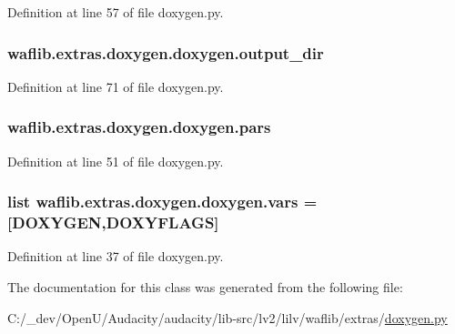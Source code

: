 Definition at line 57 of file doxygen.\+py.

\subsubsection[{\texorpdfstring{output\+\_\+dir}{output_dir}}]{\setlength{\rightskip}{0pt plus 5cm}waflib.\+extras.\+doxygen.\+doxygen.\+output\+\_\+dir}\hypertarget{classwaflib_1_1extras_1_1doxygen_1_1doxygen_a6dda9f470be0c485902a1ede0801cf14}{}\label{classwaflib_1_1extras_1_1doxygen_1_1doxygen_a6dda9f470be0c485902a1ede0801cf14}


Definition at line 71 of file doxygen.\+py.

\subsubsection[{\texorpdfstring{pars}{pars}}]{\setlength{\rightskip}{0pt plus 5cm}waflib.\+extras.\+doxygen.\+doxygen.\+pars}\hypertarget{classwaflib_1_1extras_1_1doxygen_1_1doxygen_a431448bf1c1cb60dbf666faa1ec27bfb}{}\label{classwaflib_1_1extras_1_1doxygen_1_1doxygen_a431448bf1c1cb60dbf666faa1ec27bfb}


Definition at line 51 of file doxygen.\+py.

\subsubsection[{\texorpdfstring{vars}{vars}}]{\setlength{\rightskip}{0pt plus 5cm}list waflib.\+extras.\+doxygen.\+doxygen.\+vars = \mbox{[}\textquotesingle{}D\+O\+X\+Y\+G\+EN\textquotesingle{},\textquotesingle{}D\+O\+X\+Y\+F\+L\+A\+GS\textquotesingle{}\mbox{]}\hspace{0.3cm}{\ttfamily [static]}}\hypertarget{classwaflib_1_1extras_1_1doxygen_1_1doxygen_aeee95e93ac492c95b7d4c8a52576a5b6}{}\label{classwaflib_1_1extras_1_1doxygen_1_1doxygen_aeee95e93ac492c95b7d4c8a52576a5b6}


Definition at line 37 of file doxygen.\+py.



The documentation for this class was generated from the following file\+:\begin{DoxyCompactItemize}
\item 
C\+:/\+\_\+dev/\+Open\+U/\+Audacity/audacity/lib-\/src/lv2/lilv/waflib/extras/\hyperlink{lilv_2waflib_2extras_2doxygen_8py}{doxygen.\+py}\end{DoxyCompactItemize}
